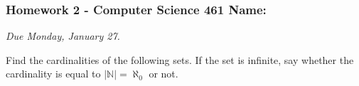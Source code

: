 \documentclass[12pt]{exam}
\newcommand{\N}{\mathbb{N}}
\begin{document}
\pagestyle{empty}
\subsubsection*{Homework 2 - Computer Science 461 \hfill Name: \underline{\hspace*{2in}}}

\textit{Due Monday, January 27.} %

\begin{questions}

\question Find the cardinalities of the following sets. If the set is infinite, say whether the cardinality is equal to $|\N| = \aleph_0$ or not. 





\end{questions}
\end{document}
